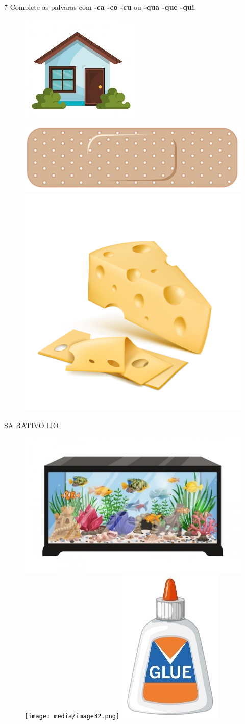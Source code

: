 \num{7} Complete as palvaras com \textbf{-ca -co -cu} ou \textbf{-qua -que -qui}.


\begin{figure}[H]
\centering
\includegraphics[width=.24\textwidth]{media/image27.jpeg}
\includegraphics[width=.24\textwidth]{media/image28.png}
\includegraphics[width=.24\textwidth]{media/image29.jpg}
\end{figure}

\begin{center}
 SA \hspace{2cm}  RATIVO \hspace{2cm}  IJO
\end{center}

\begin{figure}[H]
\centering
\includegraphics[width=.3\textwidth]{media/image30.jpeg}
\texttt{[image: media/image32.png]}
\includegraphics[width=.2\textwidth]{media/image33.jpeg}
\end{figure}


